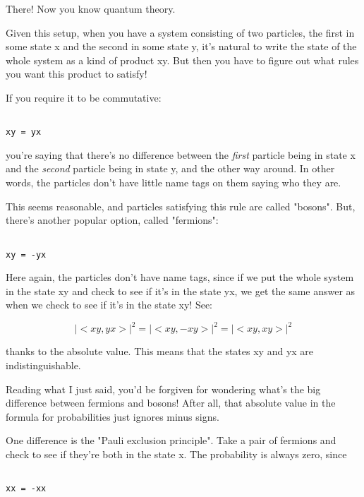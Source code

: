 There!  Now you know quantum theory.

Given this setup, when you have a system consisting of two particles, the 
first in some state x and the second in some state y, it's natural to 
write the state of the whole system as a kind of product xy.  But 
then you have to figure out what rules you want this product to satisfy!

If you require it to be commutative:


\begin{verbatim}

xy = yx
\end{verbatim}
    

you're saying that there's no difference between the \emph{first} particle
being in state x and the \emph{second} particle being in state y, and the
other way around.  In other words, the particles don't have little
name tags on them saying who they are. 

This seems reasonable, and particles satisfying this rule are called
"bosons".  But, there's another popular option, 
called "fermions":


\begin{verbatim}

xy = -yx
\end{verbatim}
    
Here again, the particles don't have name tags, since if we put
the whole system in the state xy and check to see if it's in the
state yx, we get the same answer as when we check to see if it's
in the state xy!  See:


$$

|<xy,yx>|^{2} = |<xy,-xy>|^{2}

           = |<xy,xy>|^{2}
$$
    
thanks to the absolute value.  This means that the states xy and
yx are indistinguishable.   

Reading what I just said, you'd be forgiven for wondering what's the 
big difference between fermions and bosons!  After all, that absolute 
value in the formula for probabilities just ignores minus signs.

One difference is the "Pauli exclusion principle".  Take a pair of
fermions and check to see if they're both in the state x.  The 
probability is always zero, since


\begin{verbatim}

xx = -xx  
\end{verbatim}
    

